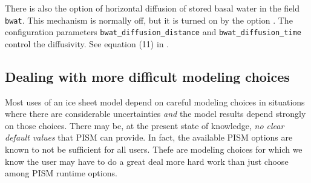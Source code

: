 There is also the option of horizontal diffusion of stored basal water in the field \texttt{bwat}.  This mechanism is normally off, but it is turned on by the option .  The configuration parameters \texttt{bwat_diffusion_distance} and \texttt{bwat_diffusion_time} control the diffusivity.  See equation (11) in \cite{BBssasliding}.



\subsection{Dealing with more difficult modeling choices}
\label{subsec:hard-choices}

Most uses of an ice sheet model depend on careful modeling choices in situations where there are considerable uncertainties \emph{and} the model results depend strongly on those choices.  There may be, at the present state of knowledge, \emph{no clear default values} that PISM can provide.  In fact, the available PISM options are known to not be sufficient for all users.  Thefe are modeling choices for which we know the user may have to do a great deal more hard work than just choose among PISM runtime options.

